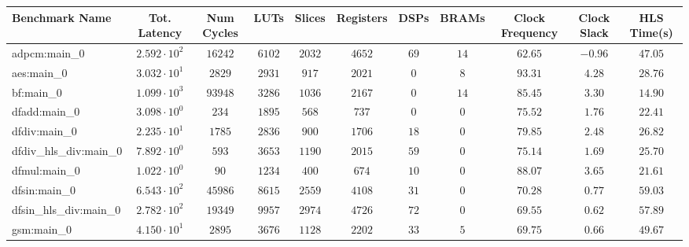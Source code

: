 \begin{tabular}{|l|c|c|c|c|c|c|c|c|c|c|}
\hline
Benchmark Name          & Tot. Latency           & Num Cycles & LUTs      & Slices    & Registers & DSPs    & BRAMs   & Clock Frequency & Clock Slack & HLS Time(s) \\
\hline
adpcm:main\_0           & $ 2.592 \cdot 10^{2} $ & $ 16242  $ & $ 6102  $ & $ 2032  $ & $ 4652  $ & $ 69  $ & $ 14  $ & $ 62.65       $ & $ -0.96   $ & $ 47.05   $ \\
aes:main\_0             & $ 3.032 \cdot 10^{1} $ & $ 2829   $ & $ 2931  $ & $ 917   $ & $ 2021  $ & $ 0   $ & $ 8   $ & $ 93.31       $ & $ 4.28    $ & $ 28.76   $ \\
bf:main\_0              & $ 1.099 \cdot 10^{3} $ & $ 93948  $ & $ 3286  $ & $ 1036  $ & $ 2167  $ & $ 0   $ & $ 14  $ & $ 85.45       $ & $ 3.30    $ & $ 14.90   $ \\
dfadd:main\_0           & $ 3.098 \cdot 10^{0} $ & $ 234    $ & $ 1895  $ & $ 568   $ & $ 737   $ & $ 0   $ & $ 0   $ & $ 75.52       $ & $ 1.76    $ & $ 22.41   $ \\
dfdiv:main\_0           & $ 2.235 \cdot 10^{1} $ & $ 1785   $ & $ 2836  $ & $ 900   $ & $ 1706  $ & $ 18  $ & $ 0   $ & $ 79.85       $ & $ 2.48    $ & $ 26.82   $ \\
dfdiv\_hls\_div:main\_0 & $ 7.892 \cdot 10^{0} $ & $ 593    $ & $ 3653  $ & $ 1190  $ & $ 2015  $ & $ 59  $ & $ 0   $ & $ 75.14       $ & $ 1.69    $ & $ 25.70   $ \\
dfmul:main\_0           & $ 1.022 \cdot 10^{0} $ & $ 90     $ & $ 1234  $ & $ 400   $ & $ 674   $ & $ 10  $ & $ 0   $ & $ 88.07       $ & $ 3.65    $ & $ 21.61   $ \\
dfsin:main\_0           & $ 6.543 \cdot 10^{2} $ & $ 45986  $ & $ 8615  $ & $ 2559  $ & $ 4108  $ & $ 31  $ & $ 0   $ & $ 70.28       $ & $ 0.77    $ & $ 59.03   $ \\
dfsin\_hls\_div:main\_0 & $ 2.782 \cdot 10^{2} $ & $ 19349  $ & $ 9957  $ & $ 2974  $ & $ 4726  $ & $ 72  $ & $ 0   $ & $ 69.55       $ & $ 0.62    $ & $ 57.89   $ \\
gsm:main\_0             & $ 4.150 \cdot 10^{1} $ & $ 2895   $ & $ 3676  $ & $ 1128  $ & $ 2202  $ & $ 33  $ & $ 5   $ & $ 69.75       $ & $ 0.66    $ & $ 49.67   $ \\

\end{tabular}
